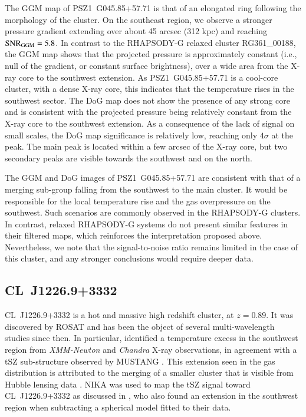 \documentclass[twocolumn,traditabstract]{aa}
\begin{document}
The GGM map of \mbox{PSZ1~G045.85+57.71} is that of an elongated ring following the morphology of the cluster. On the southeast region, we observe a stronger pressure gradient extending over about 45 arcsec (312 kpc) and reaching ${\rm SNR}_{\rm GGM} = 5.8$. In contrast to the RHAPSODY-G relaxed cluster RG361\_00188, the GGM map shows that the projected pressure is approximately constant (i.e., null of the gradient, or constant surface brightness), over a wide area from the X-ray core to the southwest extension. As \mbox{PSZ1~G045.85+57.71} is a cool-core cluster, with a dense X-ray core, this indicates that the temperature rises in the southwest sector. The DoG map does not show the presence of any strong core and is consistent with the projected pressure being relatively constant from the X-ray core to the southwest extension. As a consequence of the lack of signal on small scales, the DoG map significance is relatively low, reaching only $4 \sigma$ at the peak. The main peak is located within a few arcsec of the X-ray core, but two secondary peaks are visible towards the southwest and on the north.

The GGM and DoG images of \mbox{PSZ1~G045.85+57.71} are consistent with that of a merging sub-group falling from the southwest to the main cluster. It would be responsible for the local temperature rise and the gas overpressure on the southwest. Such scenarios are commonly observed in the RHAPSODY-G clusters. In contrast, relaxed RHAPSODY-G systems do not present similar features in their filtered maps, which reinforces the interpretation proposed above. Nevertheless, we note that the signal-to-noise ratio remains limited in the case of this cluster, and any stronger conclusions would require deeper data.

\subsection{CL~J1226.9+3332}
\mbox{CL~J1226.9+3332} is a hot and massive high redshift cluster, at $z=0.89$. It was discovered by ROSAT \citep{Ebeling2001} and has been the object of several multi-wavelength studies since then. In particular, \cite{Maughan2007} identified a temperature excess in the southwest region from \textit{XMM-Newton} and \textit{Chandra} X-ray observations, in agreement with a tSZ sub-structure observed by MUSTANG \citep{Korngut2011}. This extension seen in the gas distribution is attributed to the merging of a smaller cluster that is visible from Hubble lensing data \citep{Jee2009}. NIKA was used to map the tSZ signal toward \mbox{CL~J1226.9+3332} as discussed in \cite{Adam2015}, who also found an extension in the southwest region when subtracting a spherical model fitted to their data.
\end{document}
